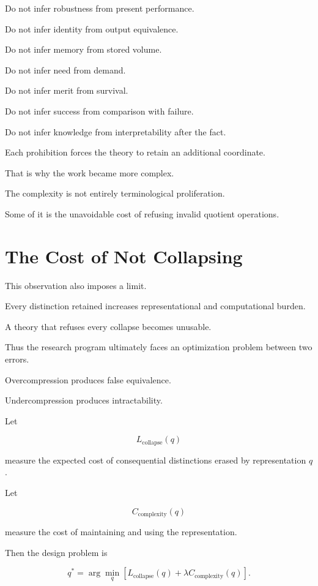 \documentclass[11pt]{article}
\theoremstyle{remark}
\begin{document}
Do not infer robustness from present performance.

Do not infer identity from output equivalence.

Do not infer memory from stored volume.

Do not infer need from demand.

Do not infer merit from survival.

Do not infer success from comparison with failure.

Do not infer knowledge from interpretability after the fact.

Each prohibition forces the theory to retain an additional coordinate.

That is why the work became more complex.

The complexity is not entirely terminological proliferation.

Some of it is the unavoidable cost of refusing invalid quotient operations.

\section{The Cost of Not Collapsing}

This observation also imposes a limit.

Every distinction retained increases representational and computational burden.

A theory that refuses every collapse becomes unusable.

Thus the research program ultimately faces an optimization problem between two errors.

Overcompression produces false equivalence.

Undercompression produces intractability.

Let

\begin{equation}
L_{\mathrm{collapse}}(q)
\end{equation}

measure the expected cost of consequential distinctions erased by representation $q$.

Let

\begin{equation}
C_{\mathrm{complexity}}(q)
\end{equation}

measure the cost of maintaining and using the representation.

Then the design problem is

\begin{equation}
q^\ast
=
\arg\min_q
\left[
L_{\mathrm{collapse}}(q)
+
\lambda
C_{\mathrm{complexity}}(q)
\right].
\end{equation}
\end{document}
